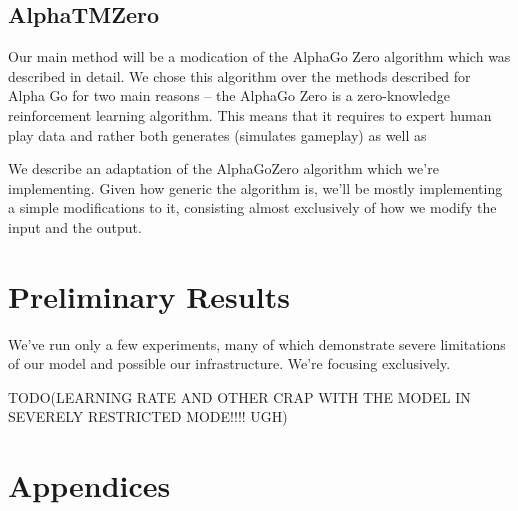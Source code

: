 \documentclass[10pt,twocolumn,letterpaper]{article}
\begin{document}
\subsection{AlphaTMZero}
Our main method will be a modication of the AlphaGo Zero \cite{AlphaGoZero} algorithm which was described in detail. We chose this algorithm over the methods described for Alpha Go \cite{AlphaGo} for two main reasons -- the AlphaGo Zero is a zero-knowledge reinforcement learning algorithm. This means that it requires to expert human play data and rather both generates (simulates gameplay) as well as 

We describe an adaptation of the AlphaGoZero algorithm which we're implementing. Given how generic the algorithm is, we'll be mostly implementing a simple modifications to it, consisting almost exclusively of how we modify the input and the output.



\section{Preliminary Results}
We've run only a few experiments, many of which demonstrate severe limitations of our model and possible our infrastructure. We're focusing exclusively.

TODO(LEARNING RATE AND OTHER CRAP WITH THE MODEL IN SEVERELY RESTRICTED MODE!!!! UGH)

\section{Appendices}
\end{document}
